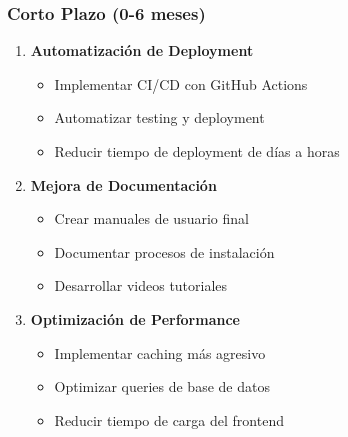 \documentclass[12pt,a4paper]{article}
\begin{document}
\subsubsection{Corto Plazo (0-6 meses)}
\begin{enumerate}
    \item \textbf{Automatización de Deployment}
    \begin{itemize}
        \item Implementar CI/CD con GitHub Actions
        \item Automatizar testing y deployment
        \item Reducir tiempo de deployment de días a horas
    \end{itemize}
    
    \item \textbf{Mejora de Documentación}
    \begin{itemize}
        \item Crear manuales de usuario final
        \item Documentar procesos de instalación
        \item Desarrollar videos tutoriales
    \end{itemize}
    
    \item \textbf{Optimización de Performance}
    \begin{itemize}
        \item Implementar caching más agresivo
        \item Optimizar queries de base de datos
        \item Reducir tiempo de carga del frontend
    \end{itemize}
\end{enumerate}
\end{document}
